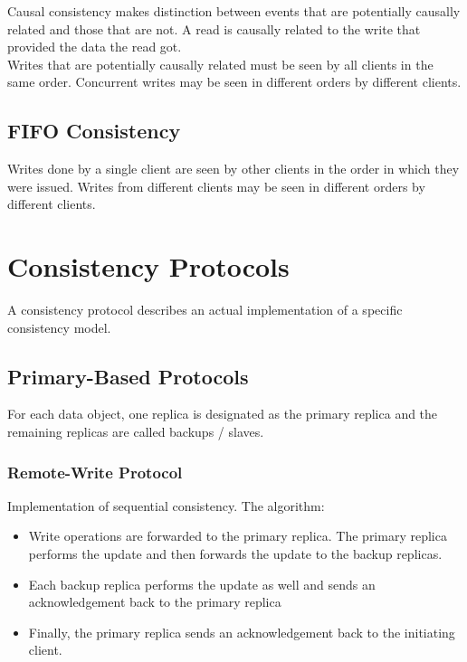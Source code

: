\begin{multicols*}{2}
\noindent Causal consistency makes distinction between events that are potentially causally related and those that are not. A read is causally related to the write that provided the data the read got.\\

\noindent Writes that are potentially causally related must be seen by all clients in the same order. Concurrent writes may be seen in different orders by different clients. 

\subsection{FIFO Consistency}

\noindent Writes done by a single client are seen by other clients in the order in which they were issued. Writes from different clients may be seen in different orders by different clients. 

\section{Consistency Protocols}

\noindent A consistency protocol describes an actual implementation of a specific consistency model.

\subsection{Primary-Based Protocols}

\noindent For each data object, one replica is designated as the primary replica and the remaining replicas are called backups / slaves. 

\subsubsection{Remote-Write Protocol}

\noindent Implementation of sequential consistency. The algorithm:

\begin{itemize}
  \item Write operations are forwarded to the primary replica. The primary replica performs the update and then forwards the update to the backup replicas.
  \item Each backup replica performs the update as well and sends an acknowledgement back to the primary replica
  \item Finally, the primary replica sends an acknowledgement back to the initiating client.
\end{itemize}


\end{multicols*}
